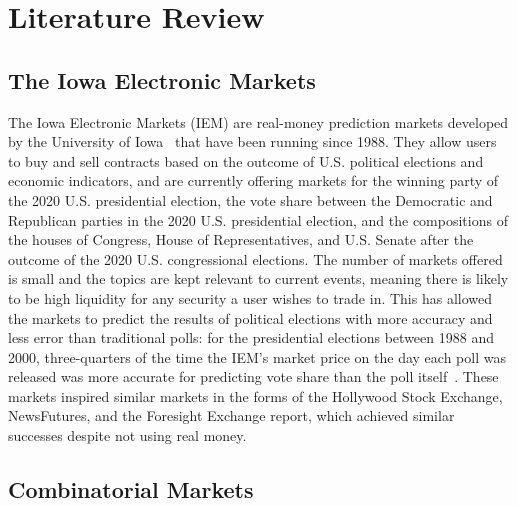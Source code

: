 \section{Literature Review}


\subsection{The Iowa Electronic Markets}

The Iowa Electronic Markets (IEM) are real-money prediction markets developed
by the University of Iowa~\cite{IEM} that have been running since 1988. They
allow users to buy and sell contracts based on the outcome of U.S. political
elections and economic indicators, and are currently offering markets for the
winning party of the 2020 U.S. presidential election, the vote share between
the Democratic and Republican parties in the 2020 U.S. presidential election,
and the compositions of the houses of Congress, House of Representatives, and
U.S. Senate after the outcome of the 2020 U.S. congressional elections. The
number of markets offered is small and the topics are kept relevant to current
events, meaning there is likely to be high liquidity for any security a user
wishes to trade in. This has allowed the markets to predict the results of
political elections with more accuracy and less error than traditional polls:
for the presidential elections between 1988 and 2000, three-quarters of the
time the IEM's market price on the day each poll was released was more accurate
for predicting vote share than the poll itself~\cite[pg.~19]{WisdomOfCrowds}.
These markets inspired similar markets in the forms of the Hollywood Stock
Exchange, NewsFutures, and the Foresight Exchange report, which achieved
similar successes despite not using real money. 

\subsection{Combinatorial Markets}

